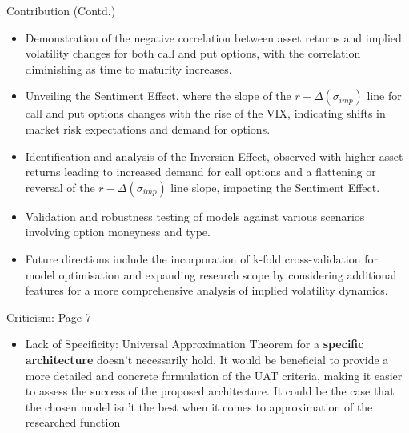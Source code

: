 \documentclass{beamer}
\begin{document}
\begin{frame}{Contribution (Contd.)}
    \begin{itemize}
        \item Demonstration of the negative correlation between asset returns and implied volatility changes for both call and put options, with the correlation diminishing as time to maturity increases.
        \item Unveiling the Sentiment Effect, where the slope of the $r - \Delta(\sigma_{imp})$ line for call and put options changes with the rise of the VIX, indicating shifts in market risk expectations and demand for options.
        \item Identification and analysis of the Inversion Effect, observed with higher asset returns leading to increased demand for call options and a flattening or reversal of the $r - \Delta(\sigma_{imp})$ line slope, impacting the Sentiment Effect.
        \item Validation and robustness testing of models against various scenarios involving option moneyness and type.
        \item Future directions include the incorporation of k-fold cross-validation for model optimisation and expanding research scope by considering additional features for a more comprehensive analysis of implied volatility dynamics.
    \end{itemize}
\end{frame}

\begin{frame}{Criticism: Page 7}
    \begin{itemize}
        \item Lack of Specificity: Universal Approximation Theorem for a \textbf{specific architecture} doesn't necessarily hold. It would be beneficial to provide a more detailed and concrete formulation of the UAT criteria, making it easier to assess the success of the proposed architecture. It could be the case that the chosen model isn't the best when it comes to approximation of the researched function
    \end{itemize}
\end{frame}
\end{document}
